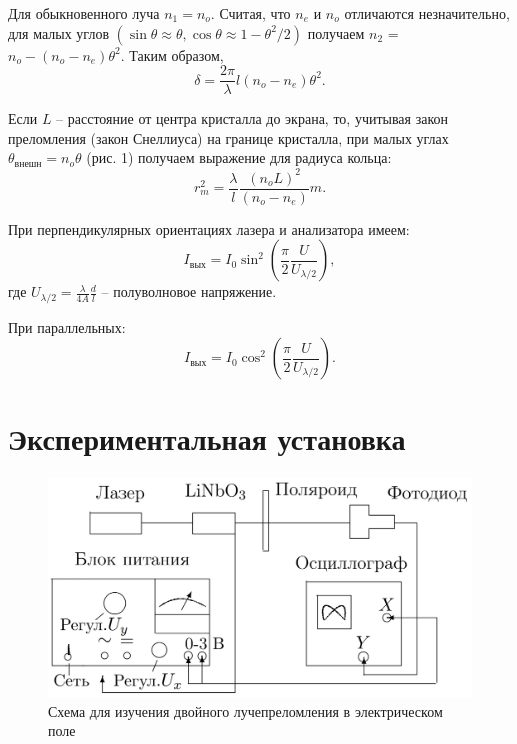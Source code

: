 \documentclass[a4paper,12pt]{article} %
\begin{document}
	Для обыкновенного луча $n_1 = n_o$. Считая, что $n_e$ и $n_o$ отличаются незначительно, для малых углов $(\sin\theta \approx \theta, \cos\theta \approx 1 - \theta^2/2)$ получаем $n_2$ = $n_o - (n_o - n_e)\theta^2$. Таким образом,
	\begin{equation*}
		\delta = \frac{2\pi}{\lambda}l(n_o - n_e)\theta^2.
	\end{equation*}


	Если $L$ -- расстояние от центра кристалла до экрана, то, учитывая закон преломления (закон Снеллиуса) на границе кристалла, при малых углах $\theta_{\text{внешн}} = n_o \theta$ (рис. 1) получаем выражение для радиуса кольца:
	\begin{equation*}
		r_m^2 = \frac{\lambda}{l}\frac{(n_o L)^2}{(n_o - n_e)}m.
	\end{equation*}


	При перпендикулярных ориентациях лазера и анализатора имеем:
	\begin{equation*}
		I_{\text{вых}} = I_0\sin^2\left(\frac{\pi}{2}\frac{U}{U_{\lambda / 2}}\right), 
	\end{equation*}
	где $U_{\lambda / 2} = \frac{\lambda}{4A} \frac{d}{l}$ -- полуволновое напряжение.

	При параллельных:
	\begin{equation*}
		I_{\text{вых}} = I_0\cos^2\left(\frac{\pi}{2}\frac{U}{U_{\lambda / 2}}\right).
	\end{equation*}

	\newpage

	\section*{Экспериментальная установка}
	\begin{figure}[h!]
		\centering
		\includegraphics[width=\linewidth]{Pictures/Осциллограф}
		\caption{Схема для изучения двойного лучепреломления в электрическом поле}
	\end{figure}
\end{document}
